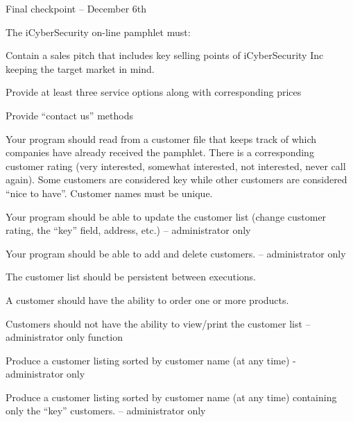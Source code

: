 Final checkpoint – December 6th

The i\+Cyber\+Security on-\/line pamphlet must\+:
\begin{DoxyEnumerate}
\item Contain a sales pitch that includes key selling points of i\+Cyber\+Security Inc keeping the target market in mind.
\item Provide at least three service options along with corresponding prices
\item Provide “contact us” methods
\item Your program should read from a customer file that keeps track of which companies have already received the pamphlet. There is a corresponding customer rating (very interested, somewhat interested, not interested, never call again). Some customers are considered key while other customers are considered “nice to have”. Customer names must be unique.
\item Your program should be able to update the customer list (change customer rating, the “key” field, address, etc.) – administrator only
\item Your program should be able to add and delete customers. – administrator only
\item The customer list should be persistent between executions.
\item A customer should have the ability to order one or more products.
\item Customers should not have the ability to view/print the customer list – administrator only function
\item Produce a customer listing sorted by customer name (at any time) -\/ administrator only
\item Produce a customer listing sorted by customer name (at any time) containing only the “key” customers. – administrator only 
\end{DoxyEnumerate}